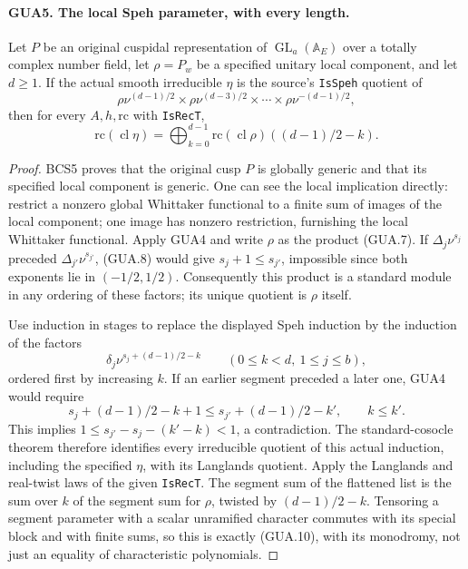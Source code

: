 \paragraph{GUA5. The local Speh parameter, with every length.}
\label{claim:GUA5}
Let $P$ be an original cuspidal representation of
$\operatorname{GL}_a(\mathbb A_E)$ over a totally complex
number field, let $\rho=P_w$ be a specified unitary local
component, and let $d\geq1$.  If the actual smooth
irreducible $\eta$ is the source's \texttt{IsSpeh}
quotient of
\[
           \rho\nu^{(d-1)/2}\times\rho\nu^{(d-3)/2}
                                  \times\cdots\times\rho\nu^{-(d-1)/2},
\]
then for every $A,h,\mathrm{rc}$ with \texttt{IsRecT},
\[
 \mathrm{rc}(\operatorname{cl}\eta)
       =\bigoplus_{k=0}^{d-1}
          \mathrm{rc}(\operatorname{cl}\rho)((d-1)/2-k).
                                                        \tag{GUA.10}
\]
\begin{proof}
BCS5 proves that the original cusp $P$ is globally generic
and that its specified local component is generic.
One can see the local implication directly: restrict a
nonzero global Whittaker functional to a finite sum of
images of the local component; one image has nonzero
restriction, furnishing the local Whittaker functional.
Apply GUA4 and write $\rho$ as the product (GUA.7).
If $\Delta_j\nu^{s_j}$ preceded
$\Delta_{j'}\nu^{s_{j'}}$, (GUA.8) would give
$s_j+1\leq s_{j'}$, impossible since both exponents
lie in $(-1/2,1/2)$.  Consequently this product is a
standard module in any ordering of these factors; its
unique quotient is $\rho$ itself.

Use induction in stages to replace the displayed Speh
induction by the induction of the factors
\[
       \delta_j\nu^{s_j+(d-1)/2-k}
                  \qquad(0\leq k<d,\ 1\leq j\leq b),
\]
ordered first by increasing $k$.  If an earlier segment
preceded a later one, GUA4 would require
\[
 s_j+(d-1)/2-k+1
                  \leq s_{j'}+(d-1)/2-k',\qquad k\leq k'.
\]
This implies $1\leq s_{j'}-s_j-(k'-k)<1$, a
contradiction.  The standard-cosocle theorem therefore
identifies every irreducible quotient of this actual
induction, including the specified $\eta$, with its
Langlands quotient.  Apply the Langlands and real-twist
laws of the given \texttt{IsRecT}.  The segment sum of
the flattened list is the sum over $k$ of the segment
sum for $\rho$, twisted by $(d-1)/2-k$.
Tensoring a segment parameter with a scalar unramified
character commutes with its special block and with finite
sums, so this is exactly (GUA.10), with its monodromy,
not just an equality of characteristic polynomials.
\end{proof}

